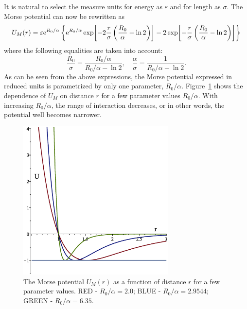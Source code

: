 \documentclass[12pt]{article}
\begin{document}
	It is natural to select the measure units for energy as $\varepsilon$ and for length as $\sigma$. The Morse potential can now be rewritten as
	\begin{equation}
		U_M(r) = \varepsilon {\rm e}^{R_0/\alpha} \left\{ {\rm e}^{R_0/\alpha} \exp[-2\frac{r}{\sigma}\left(\frac{R_0}{\alpha} - \ln2\right)] - 2\exp[-\frac{r}{\sigma} \left(\frac{R_0}{\alpha} - \ln2\right)] \right\}
	\end{equation}
	where the following equalities are taken into account:
	\begin{equation}
		\frac{R_0}{\sigma} = \frac{R_0/\alpha}{R_0/\alpha - \ln2},
		\quad
		\frac{\alpha}{\sigma} = \frac{1}{R_0/\alpha - \ln2}.
	\end{equation}
	As can be seen from the above expressions, the Morse potential expressed in reduced units is parametrized by only one parameter, $R_0/\alpha$. Figure~\ref{morse_vs_param} shows the dependence of $U_M$ on distance $r$ for a few parameter values $R_0/\alpha$. With increasing $R_0/\alpha$, the range of interaction decreases, or in other words, the potential well becomes narrower.
	
	\begin{figure}[htbp]
		\includegraphics[width=0.7\textwidth, angle=0]{morse_vs_param} 
		{\caption{\label{morse_vs_param} The Morse potential $U_M(r)$ as a function of distance $r$ for a few parameter values. RED - $R_0/\alpha = 2.0$; BLUE - $R_0/\alpha = 2.9544$; GREEN - $R_0/\alpha = 6.35$.
		}}
	\end{figure}
	
\end{document}
